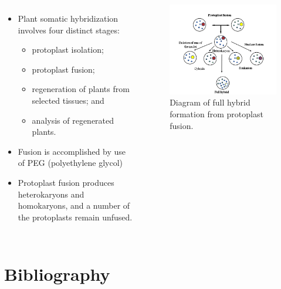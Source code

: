 \documentclass[
  ignorenonframetext,
  aspectratio=169]{beamer}
\providecommand{\tightlist}{%
  \setlength{\itemsep}{0pt}\setlength{\parskip}{0pt}}
\newcommand{\bcolumns}{\begin{columns}[T, onlytextwidth]}
\newcommand{\ecolumns}{\end{columns}}
\begin{document}
\begin{frame}{}
\protect\hypertarget{section-17}{}
\bcolumns
{}

\begin{itemize}
\tightlist
\item
  Plant somatic hybridization involves four distinct stages:

  \begin{itemize}
  \tightlist
  \item
    protoplast isolation;
  \item
    protoplast fusion;
  \item
    regeneration of plants from selected tissues; and
  \item
    analysis of regenerated plants.
  \end{itemize}
\item
  Fusion is accomplished by use of PEG (polyethylene glycol)
\item
  Protoplast fusion produces heterokaryons and homokaryons, and a number
  of the protoplasts remain unfused.
\end{itemize}


\begin{figure}
\includegraphics[width=0.9\linewidth]{../images/protoplast_fusion} \caption{Diagram of full hybrid formation from protoplast fusion.}\label{fig:protoplast-fusion}
\end{figure}

\ecolumns
\end{frame}

\hypertarget{bibliography}{%
\section{Bibliography}\label{bibliography}}
\end{document}
